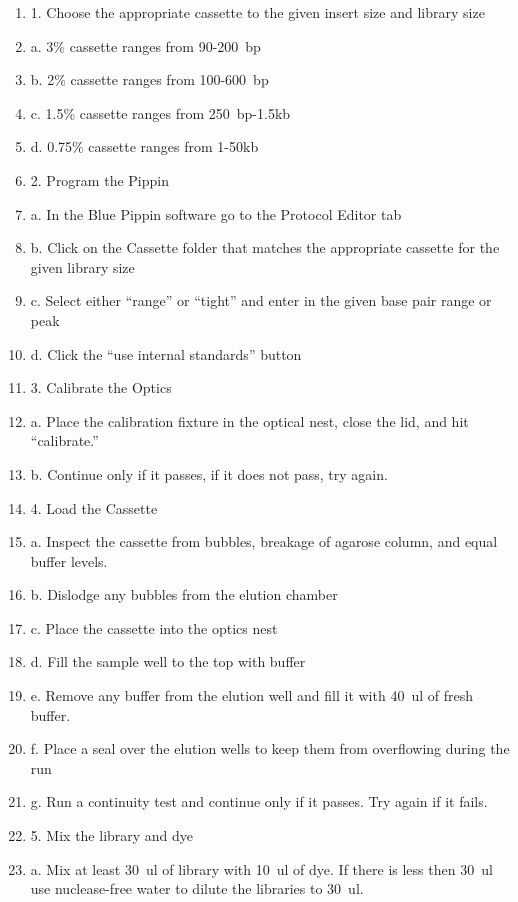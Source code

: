 \documentclass[graybox]{svmult}
\begin{document}
\begin{enumerate}
\item{1.      Choose the appropriate cassette to the given insert size and library size}
\item{a.      3\% cassette ranges from 90-200~bp}
\item{b.      2\% cassette ranges from 100-600~bp}
\item{c.      1.5\% cassette ranges from 250~bp-1.5kb}
\item{d.      0.75\% cassette ranges from 1-50kb}
\item{2.      Program the Pippin}
\item{a.      In the Blue Pippin software go to the Protocol Editor tab}
\item{b.      Click on the Cassette folder that matches the appropriate cassette for the given library size}
\item{c.      Select either “range” or “tight” and enter in the given base pair range or peak}
\item{d.      Click the “use internal standards” button}
\item{3.      Calibrate the Optics}
\item{a.      Place the calibration fixture in the optical nest, close the lid, and hit “calibrate.”}
\item{b.      Continue only if it passes, if it does not pass, try again.}
\item{4.      Load the Cassette}
\item{a.      Inspect the cassette from bubbles, breakage of agarose column, and equal buffer levels.}
\item{b.      Dislodge any bubbles from the elution chamber}
\item{c.      Place the cassette into the optics nest}
\item{d.      Fill the sample well to the top with buffer}
\item{e.      Remove any buffer from the elution well and fill it with 40~ul of fresh buffer.}
\item{f.      Place a seal over the elution wells to keep them from overflowing during the run}
\item{g.      Run a continuity test and continue only if it passes. Try again if it fails.}
\item{5.      Mix the library and dye}
\item{a.      Mix at least 30~ul of library with 10~ul of dye. If there is less then 30~ul use nuclease-free water to dilute the libraries to 30~ul.}

\end{enumerate}
\end{document}
